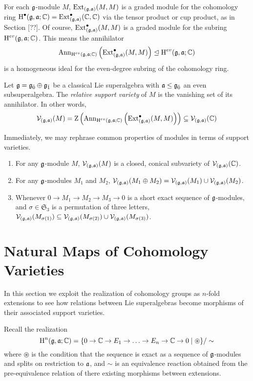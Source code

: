 For each $\mathfrak{g}$-module $M$, $\operatorname{Ext}_{(\mathfrak{g},\mathfrak{a})}(M,M)$ is a graded module for the cohomology ring $\operatorname{H}^\bullet(\mathfrak{g},\mathfrak{a};\mathbb{C}) = \operatorname{Ext}_{(\mathfrak{g},\mathfrak{a})}^\bullet(\mathbb{C},\mathbb{C})$ via the tensor product or cup product, as in Section [??]. Of course, $\operatorname{Ext}_{(\mathfrak{g},\mathfrak{a})}^\bullet(M,M)$ is a graded module for the subring $\operatorname{H}^{ev}(\mathfrak{g},\mathfrak{a};\mathbb{C})$. This means the annihilator
\[
  \operatorname{Ann}_{\operatorname{H}^{ev}(\mathfrak{g},\mathfrak{a};\mathbb{C})}\left(\operatorname{Ext}_{(\mathfrak{g},\mathfrak{a})}^\bullet(M,M)\right) \trianglelefteq \operatorname{H}^{ev}(\mathfrak{g},\mathfrak{a};\mathbb{C})
\]
is a homogeneous ideal for the even-degree subring of the cohomology ring.

\begin{definition}
  Let $\mathfrak{g} = {\mathfrak{g}}_{\bar{0}} \oplus {\mathfrak{g}}_{\bar{1}}$ be a classical Lie superalgebra with $\mathfrak{a} \leq {\mathfrak{g}}_{\bar{0}}$ an even subsuperalgebra. The \emph{relative support variety} of $M$ is the vanishing set of its annihilator. In other words,
  \[
    \mathcal{V}_{(\mathfrak{g},\mathfrak{a})}(M) = \operatorname{Z}\left( \operatorname{Ann}_{\operatorname{H}^{ev}(\mathfrak{g},\mathfrak{a};\mathbb{C})}\left(\operatorname{Ext}_{(\mathfrak{g},\mathfrak{a})}^\bullet(M,M)\right)\right) \subseteq \mathcal{V}_{(\mathfrak{g},\mathfrak{a})}(\mathbb{C})
  \]
\end{definition}

Immediately, we may rephrase common properties of modules in terms of support varieties.

\begin{proposition}
  \begin{enumerate}
  \item For any $\mathfrak{g}$-module $M$, $\mathcal{V}_{(\mathfrak{g},\mathfrak{a})}(M)$ is a closed, conical subvariety of $\mathcal{V}_{(\mathfrak{g},\mathfrak{a})}(\mathbb{C})$.
  \item For any $\mathfrak{g}$-modules $M_1$ and $M_2$, $\mathcal{V}_{(\mathfrak{g},\mathfrak{a})}(M_1 \oplus M_2) = \mathcal{V}_{(\mathfrak{g},\mathfrak{a})}(M_1) \cup \mathcal{V}_{(\mathfrak{g},\mathfrak{a})}(M_2)$.
  \item Whenever $0 \to M_1 \to M_2 \to M_3 \to 0$ is a short exact sequence of $\mathfrak{g}$-modules, and $\sigma \in \mathfrak{S}_3$ is a permutation of three letters, $\mathcal{V}_{(\mathfrak{g},\mathfrak{a})}(M_{\sigma(1)}) \subseteq \mathcal{V}_{(\mathfrak{g},\mathfrak{a})}(M_{\sigma(2)}) \cup \mathcal{V}_{(\mathfrak{g},\mathfrak{a})}(M_{\sigma(3)})$.
\end{enumerate}
\end{proposition}

\section{Natural Maps of Cohomology Varieties}
\label{sec:natural-maps}

In this section we exploit the realization of cohomology groups as $n$-fold extensions to see how relations between Lie superalgebras become morphisms of their associated support varieties.

Recall the realization
\begin{equation}
  \label{eq:ses-cohom}
  \operatorname{H}^n(\mathfrak{g},\mathfrak{a};\mathbb{C}) = \{ 0 \to \mathbb{C} \to E_1 \to \ldots \to E_n \to \mathbb{C} \to 0 \mid \circledast \} / \sim
\end{equation}
where $\circledast$ is the condition that the sequence is exact as a sequence of $\mathfrak{g}$-modules and splits on restriction to $\mathfrak{a}$, and $\sim$ is an equivalence reaction obtained from the pre-equivalence relation of there existing morphisms between extensions.

